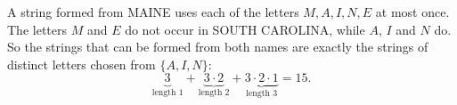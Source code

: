 A string formed from MAINE uses each of the letters $M,A,I,N,E$ at most once. The letters $M$ and $E$ do not occur in SOUTH CAROLINA, while $A$, $I$ and $N$ do. So the strings that can be formed from both names are exactly the strings of distinct letters chosen from $\{A,I,N\}$:
\[
\underbrace{3}_{\text{length }1}+\underbrace{3\cdot2}_{\text{length }2}+\underbrace{3\cdot2\cdot1}_{\text{length }3}=\boxed{15}.
\]
